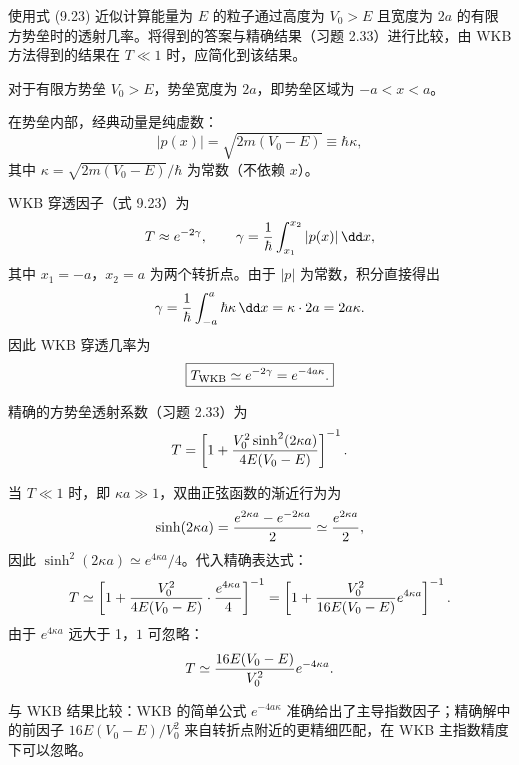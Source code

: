 \begin{question}
使用式 (9.23) 近似计算能量为 $E$ 的粒子通过高度为 $V_0>E$ 且宽度为 $2a$ 的有限方势垒时的透射几率。将得到的答案与精确结果（习题 2.33）进行比较，由 WKB 方法得到的结果在 $T\ll1$ 时，应简化到该结果。

\par\smallskip
{}

\end{question}
\begin{solution}
对于有限方势垒 $V_0>E$，势垒宽度为 $2a$，即势垒区域为 $-a<x<a$。

在势垒内部，经典动量是纯虚数：
\[
|p(x)|=\sqrt{2m(V_0-E)}\equiv\hbar\kappa,
\]
其中 $\kappa=\sqrt{2m(V_0-E)}/\hbar$ 为常数（不依赖 $x$）。

WKB 穿透因子（式 9.23）为
\[
T\approx e^{-2\gamma},
\qquad
\gamma={1\over\hbar}\int_{x_1}^{x_2}|p(x)|\,\dd x,
\]
其中 $x_1=-a$，$x_2=a$ 为两个转折点。由于 $|p|$ 为常数，积分直接得出
\[
\gamma={1\over\hbar}\int_{-a}^{a}\hbar\kappa\,\dd x
=\kappa\cdot 2a=2a\kappa.
\]
因此 WKB 穿透几率为
\[
\boxed{T_{\rm WKB}\simeq e^{-2\gamma}=e^{-4a\kappa}.}
\]

精确的方势垒透射系数（习题 2.33）为
\[
T=\left[1+{V_0^2\sinh^2(2\kappa a)\over4E(V_0-E)}\right]^{-1}.
\]

当 $T\ll1$ 时，即 $\kappa a\gg1$，双曲正弦函数的渐近行为为
\[
\sinh(2\kappa a)={e^{2\kappa a}-e^{-2\kappa a}\over2}
\simeq {e^{2\kappa a}\over2},
\]
因此 $\sinh^2(2\kappa a)\simeq e^{4\kappa a}/4$。代入精确表达式：
\[
T\simeq\left[1+{V_0^2\over4E(V_0-E)}\cdot{e^{4\kappa a}\over4}\right]^{-1}
=\left[1+{V_0^2\over16E(V_0-E)}e^{4\kappa a}\right]^{-1}.
\]
由于 $e^{4\kappa a}$ 远大于 1，$1$ 可忽略：
\[
T\simeq{16E(V_0-E)\over V_0^2}e^{-4\kappa a}.
\]

与 WKB 结果比较：WKB 的简单公式 $e^{-4a\kappa}$ 准确给出了主导指数因子；精确解中的前因子 $16E(V_0-E)/V_0^2$ 来自转折点附近的更精细匹配，在 WKB 主指数精度下可以忽略。
\end{solution}

